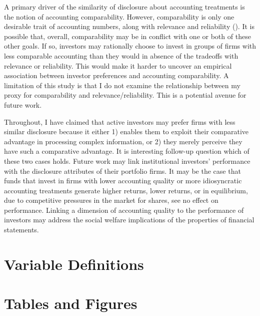 \documentclass[thesis]{thesis-umich}
\begin{document}
A primary driver of the similarity of disclosure about accounting treatments is the notion of accounting comparability. However, comparability is only one desirable trait of accounting numbers, along with relevance and reliability (\cite{fasb2010}). It is possible that, overall, comparability may be in conflict with one or both of these other goals. If so, investors may rationally choose to invest in groups of firms with less comparable accounting than they would in absence of the tradeoffs with relevance or reliability. This would make it harder to uncover an empirical association between investor preferences and accounting comparability. A limitation of this study is that I do not examine the relationship between my proxy for comparability and relevance/reliability. This is a potential avenue for future work.

Throughout, I have claimed that active investors may prefer firms with less similar disclosure because it either 1) enables them to exploit their comparative advantage in processing complex information, or 2) they merely perceive they have such a comparative advantage. It is interesting follow-up question which of these two cases holds. Future work may link institutional investors' performance with the disclosure attributes of their portfolio firms. It may be the case that funds that invest in firms with lower accounting quality or more idiosyncratic accounting treatments generate higher returns, lower returns, or in equilibrium, due to competitive pressures in the market for shares, see no effect on performance. Linking a dimension of accounting quality to the performance of investors may address the social welfare implications of the properties of financial statements.
\newpage
\appendix
\chapter{Variable Definitions}\label{app:vardefs}

\newpage
\chapter{Tables and Figures} \label{app:appendix}
\end{document}
